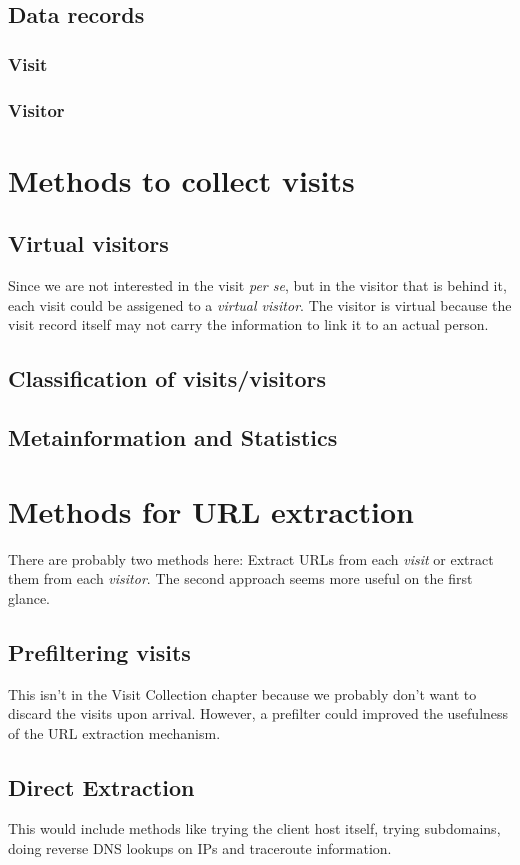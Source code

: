 \documentclass[a4paper]{danarticle}
\begin{document}
    \subsection*{Data records}
      \subsubsection*{Visit}
      \subsubsection*{Visitor}
  \section*{Methods to collect visits}
    \subsection*{Virtual visitors}
      Since we are not interested in the visit \textit{per se}, but in the
      visitor that is behind it, each visit could be assigened to a
      \textit{virtual visitor}. The visitor is virtual because the visit record
      itself may not carry the information to link it to an actual person.
    \subsection*{Classification of visits/visitors}
    \subsection*{Metainformation and Statistics}
  \section*{Methods for URL extraction}
    There are probably two methods here: Extract URLs from each \textit{visit}
    or extract them from each \textit{visitor}. The second approach seems more
    useful on the first glance.
    \subsection*{Prefiltering visits}
      This isn't in the Visit Collection chapter because we probably don't want
      to discard the visits upon arrival. However, a prefilter could improved
      the usefulness of the URL extraction mechanism.
    \subsection*{Direct Extraction}
      This would include methods like trying the client host itself, trying
      subdomains, doing reverse DNS lookups on IPs and traceroute information.
\end{document}
